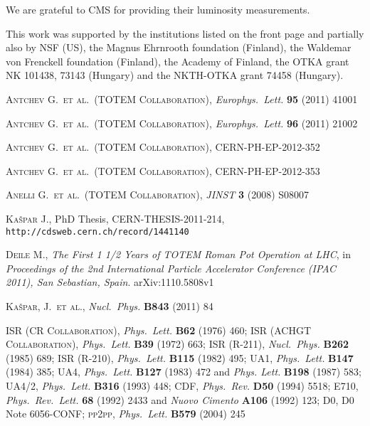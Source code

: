 \documentclass[TOTEM]{cern/cernphprep}
\def\etal{et al.}
\def\Name#1{\textsc{#1}, }
\def\REVIEW#1#2#3#4{{\it #1} {\bf #2} (#3) #4}
\begin{document}
We are grateful to CMS for providing their luminosity measurements.

This work was supported by the institutions listed on the front page and partially also by NSF (US), the Magnus
Ehrnrooth foundation (Finland), the Waldemar von Frenckell foundation (Finland), the Academy of
Finland, the OTKA grant NK 101438, 73143 (Hungary) and the NKTH-OTKA grant 74458 (Hungary).

\fi

\begin{thebibliography}{99}

\iffalse
{}
	\Name{Antchev G.~\etal{}~(TOTEM Collaboration)}
	\REVIEW{Europhys.~Lett.}{95}{2011}{41001}

	\Name{Antchev G.~\etal{}~(TOTEM Collaboration)}
	\REVIEW{Europhys.~Lett.}{96}{2011}{21002}

	\Name{Antchev G.~\etal{}~(TOTEM Collaboration)}
	CERN-PH-EP-2012-352

	\Name{Antchev G.~\etal{}~(TOTEM Collaboration)}
	CERN-PH-EP-2012-353

	\Name{Anelli G.~\etal{}~(TOTEM Collaboration)}
	\REVIEW{JINST}{3}{2008}{S08007}

	\Name{Ka\v spar J.}
	PhD Thesis, CERN-THESIS-2011-214, {\tt http://cdsweb.cern.ch/record/1441140}

	\Name{Deile M.}
	{\it The First 1 1/2 Years of TOTEM Roman Pot Operation at LHC}, in
	{\it Proceedings of the 2nd International Particle Accelerator Conference (IPAC 2011), San Sebastian, Spain}. 
	arXiv:1110.5808v1

	\Name{Ka\v spar, J.~\etal}
	\REVIEW{Nucl.~Phys.}{B843}{2011}{84}


	\Name{ISR (CR Collaboration)} \REVIEW{Phys.~Lett.}{B62}{1976}{460}; 
	\Name{ISR (ACHGT Collaboration)} \REVIEW{Phys.~Lett.}{B39}{1972}{663}; 
	\Name{ISR (R-211)} \REVIEW{Nucl.~Phys.}{B262}{1985}{689}; 
	\Name{ISR (R-210)} \REVIEW{Phys.~Lett.}{B115}{1982}{495}; 
	\Name{UA1} \REVIEW{Phys.~Lett.}{B147}{1984}{385}; 
	\Name{UA4} \REVIEW{Phys.~Lett.}{B127}{1983}{472} and \REVIEW{Phys. Lett.}{B198}{1987}{583}; 
	\Name{UA4/2} \REVIEW{Phys.~Lett.}{B316}{1993}{448}; 
	\Name{CDF} \REVIEW{Phys.~Rev.}{D50}{1994}{5518}; 
	\Name{E710} \REVIEW{Phys.~Rev.~Lett.}{68}{1992}{2433} and \REVIEW{Nuovo Cimento}{A106}{1992}{123}; 
	\Name{D0} D0 Note 6056-CONF; 
	\Name{pp2pp} \REVIEW{Phys.~Lett.}{B579}{2004}{245}


\end{thebibliography}
\end{document}
